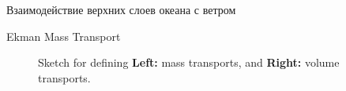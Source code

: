 \begin{chapter}{Взаимодействие верхних слоев океана с ветром}
\begin{section}{Ekman Mass Transport}
\begin{figure}[h!]
\caption{Sketch for defining \textbf{Left:} mass
transports, and \textbf{Right:} volume
transports.}
\label{fig:transportsketch}
\end{figure}
%


\end{section}
\end{chapter}
